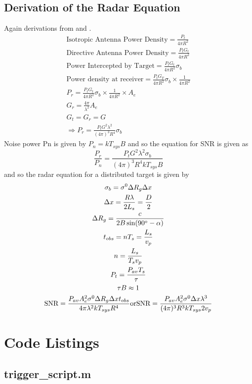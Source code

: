 \section{Derivation of the Radar Equation}
Again derivations from \cite{richardsRemoteSensingImaging2009} and \cite{watsonEE40136RadarSystems2020}. \begin{gather}
 \text{Isotropic Antenna Power Density} = \frac{P_t}{4\pi R^2}\\
 \text{Directive Antenna Power Density} = \frac{P_tG_t}{4\pi R^2}\\
 \text{Power Intercepted by Target} = \frac{P_tG_t}{4\pi R^2}\sigma_b\\
 \text{Power density at receiver} = \frac{P_tG_T}{4\pi R^2}\sigma_b \times \frac{1}{4\pi R^2}\\
 P_r = \frac{P_tG_t}{4\pi R^2} \sigma_b \times \frac{1}{4\pi R^2} \times A_e \\
 G_r = \frac{4\pi}{\lambda^2}A_e\\
 G_t = G_r = G \\
 \Rightarrow P_r = \frac{P_tG^2\lambda^2}{(4\pi)^3R^4}\sigma_b
 \end{gather}
 Noise power \gls{Pn} is given by $P_n = kT_{sys}B$ and so the equation for SNR is given as \[ \frac{P_r}{P_n} = \frac{P_tG^2\lambda^2\sigma_b}{(4\pi)^3R^4kT_{sys}B}\] and so the radar equation for a distributed target is given by 
 \begin{gather}
 \sigma_b = \sigma^0 \Delta R_g \Delta x \\
 	\Delta x = \frac{R\lambda}{2L_s} = \frac{D}{2}\\
 	\Delta R_g = \frac{c}{2B\sin(90\degree - \alpha)}\\
 	t_{obs} = nT_s = \frac{L_s}{v_p}\\
 	n = \frac{L_s}{T_sv_p}\\
 	P_t = \frac{P_{av}T_s}{\tau}\\
 	\tau B \approx 1\\
 	\text{SNR}=\frac{P_{av}A_e^2\sigma^0\Delta R_g\Delta x t_{obs}}{4\pi\lambda^2kT_{sys}R^4} \text{or} \text{SNR} = \frac{P_{av}A_e^2\sigma^0\Delta x\lambda^3}{(4\pi)^3R^3kT_{sys}2v_p}
 \end{gather}


\chapter{Code Listings}
\label{appen:listings}
\section{trigger\_script.m}
\inputminted[breaklines]{matlab}{../blender/trigger_script.m}
\label{lst:trigger_script}
